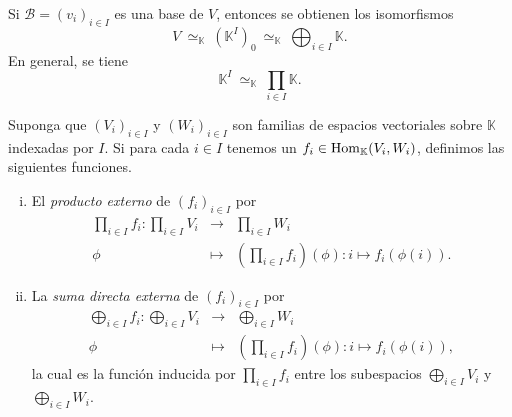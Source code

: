 \begin{obs}
Si $\mathcal{B}=(v_i)_{i\in I}$ es una base de $V$, entonces se obtienen los isomorfismos
\[
V\ \simeq_\mathbb{K}\ \left(\mathbb{K}^I\right)_0\ \simeq_\mathbb{K}\ \bigoplus_{i\in I}\mathbb{K}.
\]
En general, se tiene
\[
\mathbb{K}^I\ \simeq_\mathbb{K}\ \prod_{i\in I} \mathbb{K}.
\]
\end{obs}

\begin{defn}\label{productoysumadefunciones}
  Suponga que $\left(V_i\right)_{i\in I}$ y $\left(W_i\right)_{i\in I}$ son familias de espacios vectoriales sobre $\mathbb{K}$ indexadas por $I$. Si para cada $i\in I$ tenemos un $f_i\in\operatorname{Hom}_\mathbb{K}(V_i,W_i)$, definimos las siguientes funciones.
\begin{enumerate}[(i)]
  \item El \emph{producto externo} de $\left(f_i\right)_{i\in I}$ por
    \begin{eqnarray*}
    \prod_{i\in I} f_i: \prod_{i\in I} V_i & \longrightarrow & \prod_{i\in I} W_i\\
                           \phi & \longmapsto & \left(\prod_{i\in I} f_i\right) (\phi): i\mapsto f_i\left(\phi(i)\right).
    \end{eqnarray*}
  \item La \emph{suma directa externa} de $\left(f_i\right)_{i\in I}$ por
    \begin{eqnarray*}
    \bigoplus_{i\in I} f_i: \bigoplus_{i\in I} V_i & \longrightarrow & \bigoplus_{i\in I} W_i\\
                           \phi & \longmapsto & \left(\prod_{i\in I} f_i\right) (\phi): i\mapsto f_i\left(\phi(i)\right),
    \end{eqnarray*}
  la cual es la función inducida por $\prod_{i\in I} f_i$ entre los subespacios $\bigoplus_{i\in I} V_i$ y $\bigoplus_{i\in I} W_i$.
\end{enumerate}
\end{defn}

